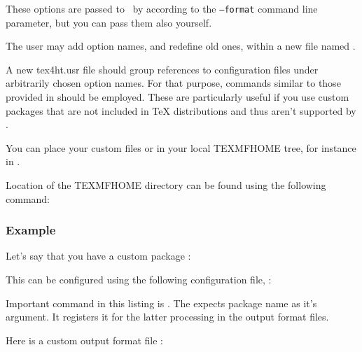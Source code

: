 These options are passed to \texfourht\ by \makefourht according to the \texttt{--format} 
command line parameter, but you can pass them also yourself. 

The user may add option names, and redefine old ones, within a new file named .

A new tex4ht.usr file should group references to  configuration files
under arbitrarily chosen option names. For that purpose,  commands
similar to those provided in  should be employed. 
These are particularly useful if you use custom packages that are not included in TeX distributions
and thus aren't supported by \texfourht.

You can place your custom  files or  in your local TEXMFHOME tree, for instance
in .

Location of the TEXMFHOME directory can be found using the following command:


\subsubsection{Example}

Let's say that you have a custom package :


This can be configured using the following configuration file, :


Important command in this listing is . The  expects
package name as it's argument. It registers it for the latter processing in the output format files.

Here is a custom output format file :


